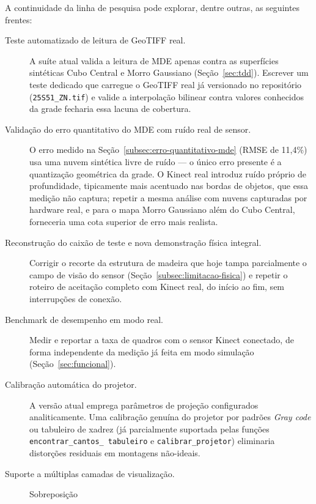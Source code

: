 A continuidade da linha de pesquisa pode explorar, dentre outras, as
seguintes frentes:

\begin{description}
    \item[Teste automatizado de leitura de GeoTIFF real.] A suíte atual
          valida a leitura de MDE apenas contra as superfícies
          sintéticas Cubo Central e Morro Gaussiano (Seção~\ref{sec:tdd}).
          Escrever um teste dedicado que carregue o GeoTIFF real já
          versionado no repositório (\texttt{25S51\_ZN.tif}) e valide a
          interpolação bilinear contra valores conhecidos da grade
          fecharia essa lacuna de cobertura.
    \item[Validação do erro quantitativo do MDE com ruído real de
          sensor.] O erro medido na Seção~\ref{subsec:erro-quantitativo-mde}
          (RMSE de 11,4\%) usa uma nuvem sintética livre de ruído — o
          único erro presente é a quantização geométrica da grade. O
          Kinect real introduz ruído próprio de profundidade,
          tipicamente mais acentuado nas bordas de objetos, que essa
          medição não captura; repetir a mesma análise com nuvens
          capturadas por hardware real, e para o mapa Morro Gaussiano
          além do Cubo Central, forneceria uma cota superior de erro
          mais realista.
    \item[Reconstrução do caixão de teste e nova demonstração física
          integral.] Corrigir o recorte da estrutura de madeira que
          hoje tampa parcialmente o campo de visão do sensor
          (Seção~\ref{subsec:limitacao-fisica}) e repetir o roteiro de
          aceitação completo com Kinect real, do início ao fim, sem
          interrupções de conexão.
    \item[Benchmark de desempenho em modo real.] Medir e reportar a
          taxa de quadros com o sensor Kinect conectado, de forma
          independente da medição já feita em modo simulação
          (Seção~\ref{sec:funcional}).
    \item[Calibração automática do projetor.] A versão atual emprega
          parâmetros de projeção configurados analiticamente. Uma
          calibração genuína do projetor por padrões \textit{Gray code}
          ou tabuleiro de xadrez (já parcialmente suportada pelas
          funções \texttt{encontrar\_\allowbreak cantos\_\allowbreak
          tabuleiro} e \texttt{calibrar\_\allowbreak projetor})
          eliminaria distorções residuais em montagens não-ideais.
    \item[Suporte a múltiplas camadas de visualização.] Sobreposição

\end{description}
